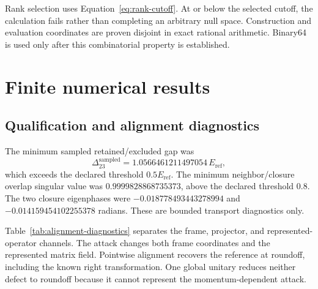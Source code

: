 \documentclass[11pt]{article}
\newcommand{\eref}{E_{\mathrm{ref}}}
\begin{document}
Rank selection uses Equation~\eqref{eq:rank-cutoff}.  At or below the selected cutoff,
the calculation fails rather than completing an arbitrary null space.  Construction and
evaluation coordinates are proven disjoint in exact rational arithmetic.  Binary64 is
used only after this combinatorial property is established.

\section{Finite numerical results}

\subsection{Qualification and alignment diagnostics}

The minimum sampled retained/excluded gap was
\begin{equation}
 \Delta_{23}^{\mathrm{sampled}}
 =1.0566461211497054\,\eref,
\end{equation}
which exceeds the declared threshold $0.5\eref$.  The minimum neighbor/closure overlap
singular value was $0.9999828868735373$, above the declared threshold $0.8$.  The two
closure eigenphases were $-0.018778493443278994$ and
$-0.014159454102255378$ radians.  These are bounded transport diagnostics only.

Table~\ref{tab:alignment-diagnostics} separates the frame, projector, and
represented-operator channels.  The attack changes both frame coordinates and the
represented matrix field.  Pointwise alignment recovers the reference at roundoff,
including the known right transformation.  One global unitary reduces neither defect
to roundoff because it cannot represent the momentum-dependent attack.
\end{document}
